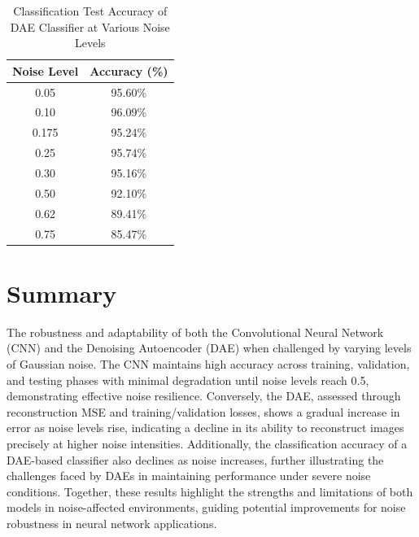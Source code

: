 \vspace*{1.5in}

\begin{table}[ht]
\centering
\label{tab:dae_classifier_accuracy}
\begin{tabular}{c|c}
\toprule
\textbf{Noise Level} & \textbf{Accuracy (\%)} \\
\midrule
0.05 & 95.60\% \\
0.10 & 96.09\% \\
0.175 & 95.24\% \\
0.25 & 95.74\% \\
0.30 & 95.16\% \\
0.50 & 92.10\% \\
0.62 & 89.41\% \\
0.75 & 85.47\% \\
\bottomrule
\end{tabular}
\caption{Classification Test Accuracy of DAE Classifier at Various Noise Levels}
\end{table}

\section{Summary}
The robustness and adaptability of both the Convolutional Neural Network (CNN) and the Denoising Autoencoder (DAE) when challenged by varying levels of Gaussian noise. The CNN maintains high accuracy across training, validation, and testing phases with minimal degradation until noise levels reach 0.5, demonstrating effective noise resilience. Conversely, the DAE, assessed through reconstruction MSE and training/validation losses, shows a gradual increase in error as noise levels rise, indicating a decline in its ability to reconstruct images precisely at higher noise intensities. Additionally, the classification accuracy of a DAE-based classifier also declines as noise increases, further illustrating the challenges faced by DAEs in maintaining performance under severe noise conditions. Together, these results highlight the strengths and limitations of both models in noise-affected environments, guiding potential improvements for noise robustness in neural network applications.



